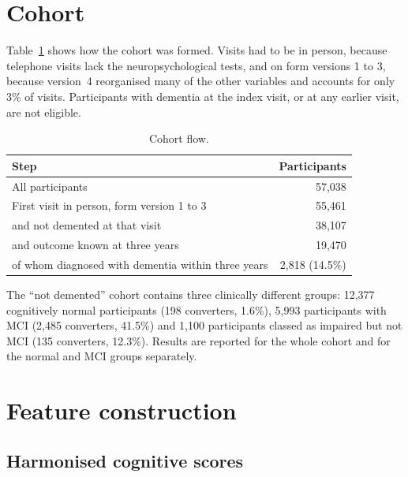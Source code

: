 \section{Cohort}

Table~\ref{tab:flow} shows how the cohort was formed. Visits had to be in person, because telephone visits lack the neuropsychological tests, and on form versions 1 to 3, because version~4 reorganised many of the other variables and accounts for only 3\% of visits. Participants with dementia at the index visit, or at any earlier visit, are not eligible.

\begin{table}[H]
\centering\small
\caption{Cohort flow.}
\label{tab:flow}
\begin{tabular}{@{}lr@{}}
\toprule
Step & Participants \\
\midrule
All participants & 57,038 \\
First visit in person, form version 1 to 3 & 55,461 \\
\quad and not demented at that visit & 38,107 \\
\quad and outcome known at three years & 19,470 \\
\quad\quad of whom diagnosed with dementia within three years & 2,818 (14.5\%) \\
\bottomrule
\end{tabular}
\end{table}

The ``not demented'' cohort contains three clinically different groups: 12,377 cognitively normal participants (198 converters, 1.6\%), 5,993 participants with MCI (2,485 converters, 41.5\%) and 1,100 participants classed as impaired but not MCI (135 converters, 12.3\%). Results are reported for the whole cohort and for the normal and MCI groups separately.

\section{Feature construction}

\subsection{Harmonised cognitive scores}
\label{sec:zscores}

